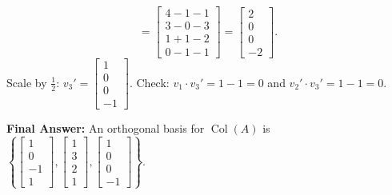 \documentclass[11pt, letterpaper]{article}
\theoremstyle{definition}
\theoremstyle{remark}
\begin{document}
\begin{enumerate}[label=\textbf{Step \arabic*:}]
\[        = \begin{bmatrix} 4 - 1 - 1 \\ 3 - 0 - 3 \\ 1 + 1 - 2 \\ 0 - 1 - 1 \end{bmatrix}
        = \begin{bmatrix} 2 \\ 0 \\ 0 \\ -2 \end{bmatrix}.
    \]
    Scale by $\frac{1}{2}$: $v_3' = \begin{bmatrix} 1 \\ 0 \\ 0 \\ -1 \end{bmatrix}$. Check: $v_1 \cdot v_3' = 1 - 1 = 0$ and $v_2' \cdot v_3' = 1 - 1 = 0$.
\end{enumerate}
\textbf{Final Answer:} An orthogonal basis for $\operatorname{Col}(A)$ is $\left\{ \begin{bmatrix} 1 \\ 0 \\ -1 \\ 1 \end{bmatrix}, \begin{bmatrix} 1 \\ 3 \\ 2 \\ 1 \end{bmatrix}, \begin{bmatrix} 1 \\ 0 \\ 0 \\ -1 \end{bmatrix} \right\}$.

\vspace{0.8em}
\end{document}
